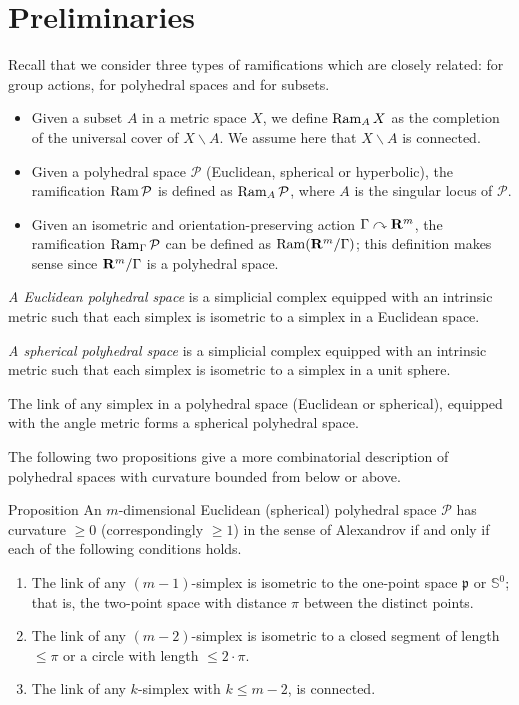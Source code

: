 \documentclass{compositio}
\begin{document}
\section{Preliminaries}\label{sec:prelim}

Recall that we consider three types of ramifications which are closely related:
for group actions, for polyhedral spaces and for subsets.

\begin{itemize}
\item Given a subset $A$ in a metric space $X$, we define $\mathop{\rm Ram}\nolimits_A X$ as  the completion of the universal cover of $X\backslash A$. We assume here that $X\backslash A$ is connected.
\item Given a polyhedral space $\mathcal{P}$ (Euclidean, spherical or hyperbolic), the ramification $\mathop{\rm Ram}\nolimits \mathcal{P}$ is defined as $\mathop{\rm Ram}\nolimits_{A} \mathcal{P}$, where $A$ is the singular locus of $\mathcal{P}$.
\item Given an isometric and orientation-preserving action $\Gamma\curvearrowright\mathbf{R}^m$, the ramification $\mathop{\rm Ram}\nolimits_{\Gamma} \mathcal{P}$ can be defined as $\mathop{\rm Ram}\nolimits (\mathbf{R}^m/\Gamma)$;
this definition makes sense since $\mathbf{R}^m/\Gamma$ is a polyhedral space.
\end{itemize}


\emph{A Euclidean polyhedral space} is a simplicial complex equipped with an intrinsic metric such that each simplex is isometric to a simplex in a Euclidean space.

\emph{A spherical polyhedral space} is a simplicial complex equipped with an intrinsic metric such that each simplex is isometric to a simplex in a unit sphere.

The link of any simplex in a polyhedral space
(Euclidean or spherical),
equipped with the angle metric forms a spherical polyhedral space.

The following two propositions give a more combinatorial description of polyhedral spaces with curvature bounded from below or above.

\begin{thm}{Proposition}\label{prop:poly-cbb}
An $m$-dimensional Euclidean (spherical) polyhedral space $\mathcal{P}$
has curvature $\ge 0$ (correspondingly $\ge 1$)
in the sense of Alexandrov
if and only if each of the following conditions holds.
\begin{enumerate}
\item The link of any $(m-1)$-simplex is isometric to the one-point space $\mathfrak{p}$ or $\mathbb{S}^0$; 
that is, the two-point space with distance $\pi$ between the distinct points.
\item The link of any $(m-2)$-simplex is isometric to a closed segment of length $\le \pi$ or a circle with length $\le2\cdot\pi$.
\item The link of any $k$-simplex with $k\le m-2$, is connected.
\end{enumerate}

\end{thm}
\end{document}
